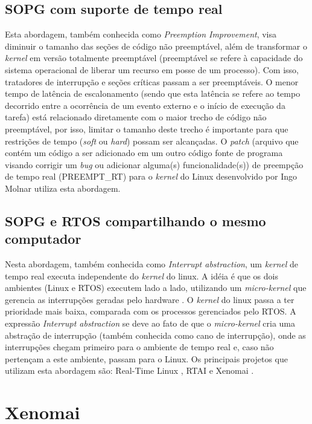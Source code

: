 \subsection{SOPG com suporte de tempo real}

	Esta abordagem, também conhecida como \textit{Preemption Improvement}, visa diminuir o tamanho das seções de código não preemptável, além de transformar o \textit{kernel} em versão totalmente preemptável (preemptável se refere à capacidade do sistema operacional de liberar um recurso em posse de um processo). Com isso, tratadores de interrupção e seções críticas passam a ser preemptáveis. O menor tempo de latência de escalonamento (sendo que esta latência se refere ao tempo decorrido entre a ocorrência de um evento externo e o início de execução da tarefa) está relacionado diretamente com o maior trecho de código não preemptável, por isso, limitar o tamanho deste trecho é importante para que restrições de tempo (\textit{soft} ou \textit{hard}) possam ser alcançadas. O \textit{patch} (arquivo que contém um código a ser adicionado em um outro código fonte de programa visando corrigir um \textit{bug} ou adicionar alguma(s) funcionalidade(s)) de preempção de tempo real (PREEMPT\_RT) \cite{MCKENNEY05} para o \textit{kernel} do Linux desenvolvido por Ingo Molnar utiliza esta abordagem.
	
\subsection{SOPG e RTOS compartilhando o mesmo computador}

	Nesta abordagem, também conhecida como \textit{Interrupt abstraction}, um \textit{kernel} de tempo real executa independente do \textit{kernel} do linux. A idéia é que os dois ambientes (Linux e RTOS) executem lado a lado, utilizando um \textit{micro-kernel} que gerencia as interrupções geradas pelo hardware \cite{GERUM04}. O \textit{kernel} do linux passa a ter prioridade mais baixa, comparada com os processos gerenciados pelo RTOS. A expressão \textit{Interrupt abstraction}  se deve ao fato de que o \textit{micro-kernel} cria uma abstração de interrupção (também conhecida como cano de interrupção), onde as interrupções chegam primeiro para o ambiente de tempo real e, caso não pertençam a este ambiente, passam para o Linux. Os principais projetos que utilizam esta abordagem são: Real-Time Linux \cite{YOBA97}, RTAI \cite{RTAI08} e Xenomai \cite{GERUM04}.

\section{Xenomai}

